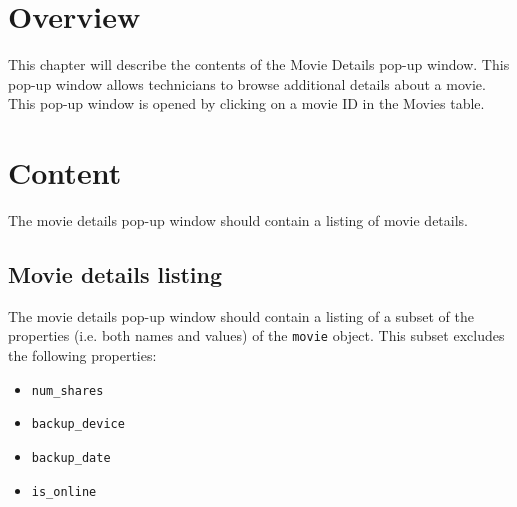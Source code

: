 \section{Overview}

This chapter will describe the contents of the Movie Details pop-up window. This pop-up
window allows technicians to browse additional details about a movie.
This pop-up window is opened by clicking on a movie ID in the Movies table.

\section{Content}

The movie details pop-up window should contain a listing of movie details.

\subsection{Movie details listing}

The movie details pop-up window should contain a listing of a subset of the properties 
(i.e. both names and values) of the \texttt{movie} object. This subset excludes the
following properties:
\begin{itemize}\itemsep1pt
    \item \texttt{num\_shares}
    \item \texttt{backup\_device}
    \item \texttt{backup\_date}
    \item \texttt{is\_online}
\end{itemize}
